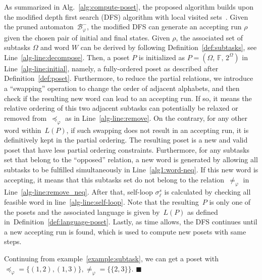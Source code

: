 As summarized in Alg.~\ref{alg:compute-poset},
the proposed algorithm builds upon the modified depth first search (DFS)
algorithm with local visited sets~\citep{sedgewick2001algorithms}.
Given the pruned automaton~$\mathcal{B}_{\varphi}^-$,
the modified DFS can generate an accepting run $\rho$ given the chosen pair of
initial and final states.
Given $\rho$, the associated set of subtasks $\Omega$ and word $W$ can be
derived by following Definition~\ref{def:subtasks}, see Line~\ref{alg-line:decompose}.
Then, a poset $P$ is initialized as $P=(\Omega,\, \mathbb{F},\, 2^{\Omega})$
in Line~\ref{alg-line:initial},
namely, a fully-ordered poset as described after Definition~\ref{def:poset}.
Furthermore, to reduce the partial relations,
we introduce a ``swapping'' operation to change the order of adjacent alphabets,
and then check if the resulting new word can lead to an accepting run.
If so, it means the relative ordering of this two adjacent subtasks can
potentially be relaxed or removed from~$\preceq_{\varphi}$ as in Line~\ref{alg-line:remove}.
On the contrary, for any other word within~$L(P)$, if such swapping does not
result in an accepting run, it is definitively kept in the partial ordering.
The resulting poset is a new and valid poset that have less partial
ordering constraints.
Furthermore, for any subtasks set that belong to the ``opposed'' relation,
a new word is generated by allowing all subtasks to be fulfilled simultaneously
in Line~\ref{alg1:word-neq}.
If this new word is accepting, it means that this subtasks set do not belong to the
relation~$\neq_{\varphi}$ in Line~\ref{alg-line:remove_neq}. After that, self-loop $\sigma^s_\ell$ is calculated
by checking all feasible word in line~\ref{alg-line:self-loop}.
Note that the resulting~$P$ is only one of the posets and the associated language is
given by~$L(P)$ as defined in~Definition~\ref{def:language-poset}.
Lastly, as time allows, the DFS continues until a new accepting run is found,
which is used to compute new posets with same steps.

\begin{example}
	Continuing from example~\ref{example:subtask}, we can get a poset with
	$\preceq_\varphi=\{(1,2),(1,3)\},\neq_{\varphi}=\{\{2,3\}\}$.
        \hfill $\blacksquare$
\end{example}

